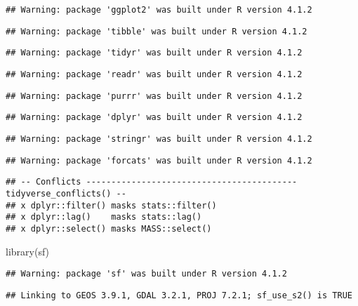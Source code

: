 \documentclass[
]{article}
\newenvironment{Shaded}{\begin{snugshade}}{\end{snugshade}}
\newcommand{\FunctionTok}[1]{\textcolor[rgb]{0.00,0.00,0.00}{#1}}
\newcommand{\NormalTok}[1]{#1}
\begin{document}
\begin{verbatim}
## Warning: package 'ggplot2' was built under R version 4.1.2
\end{verbatim}

\begin{verbatim}
## Warning: package 'tibble' was built under R version 4.1.2
\end{verbatim}

\begin{verbatim}
## Warning: package 'tidyr' was built under R version 4.1.2
\end{verbatim}

\begin{verbatim}
## Warning: package 'readr' was built under R version 4.1.2
\end{verbatim}

\begin{verbatim}
## Warning: package 'purrr' was built under R version 4.1.2
\end{verbatim}

\begin{verbatim}
## Warning: package 'dplyr' was built under R version 4.1.2
\end{verbatim}

\begin{verbatim}
## Warning: package 'stringr' was built under R version 4.1.2
\end{verbatim}

\begin{verbatim}
## Warning: package 'forcats' was built under R version 4.1.2
\end{verbatim}

\begin{verbatim}
## -- Conflicts ------------------------------------------ tidyverse_conflicts() --
## x dplyr::filter() masks stats::filter()
## x dplyr::lag()    masks stats::lag()
## x dplyr::select() masks MASS::select()
\end{verbatim}

\begin{Shaded}
\begin{Highlighting}[]
\FunctionTok{library}\NormalTok{(sf)}
\end{Highlighting}
\end{Shaded}

\begin{verbatim}
## Warning: package 'sf' was built under R version 4.1.2
\end{verbatim}

\begin{verbatim}
## Linking to GEOS 3.9.1, GDAL 3.2.1, PROJ 7.2.1; sf_use_s2() is TRUE
\end{verbatim}
\end{document}
